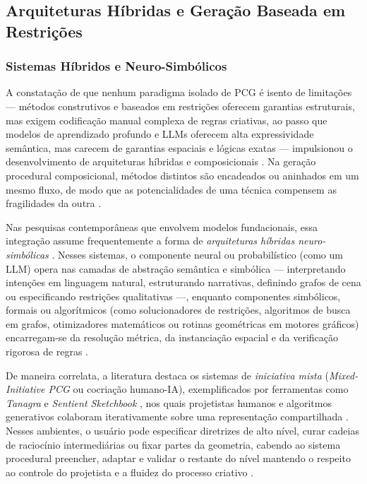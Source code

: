 \subsection{Arquiteturas Híbridas e Geração Baseada em Restrições}
\label{sec:arquiteturas_hibridas}

\subsubsection{Sistemas Híbridos e Neuro-Simbólicos}
\label{sec:sistemas_hibridos}

A constatação de que nenhum paradigma isolado de PCG é isento de limitações --- métodos construtivos e baseados em restrições oferecem garantias estruturais, mas exigem codificação manual complexa de regras criativas, ao passo que modelos de aprendizado profundo e LLMs oferecem alta expressividade semântica, mas carecem de garantias espaciais e lógicas exatas --- impulsionou o desenvolvimento de arquiteturas híbridas e composicionais \cite{linden2014dungeons, Gallotta_2024, maleki2024procedural}. Na geração procedural composicional, métodos distintos são encadeados ou aninhados em um mesmo fluxo, de modo que as potencialidades de uma técnica compensem as fragilidades da outra \cite{linden2014dungeons, maleki2024procedural}.

Nas pesquisas contemporâneas que envolvem modelos fundacionais, essa integração assume frequentemente a forma de \textit{arquiteturas híbridas neuro-simbólicas} \cite{Gallotta_2024, hu2024scenecraft, chen2025narrative, xu2025constraint}. Nesses sistemas, o componente neural ou probabilístico (como um LLM) opera nas camadas de abstração semântica e simbólica --- interpretando intenções em linguagem natural, estruturando narrativas, definindo grafos de cena ou especificando restrições qualitativas ---, enquanto componentes simbólicos, formais ou algorítmicos (como solucionadores de restrições, algoritmos de busca em grafos, otimizadores matemáticos ou rotinas geométricas em motores gráficos) encarregam-se da resolução métrica, da instanciação espacial e da verificação rigorosa de regras \cite{hu2024scenecraft, tang2025unrealllm, chen2025narrative, xu2025constraint, xu2025databasedrivenframework3dlevel, her2025zeroshot3dmapgeneration}.

De maneira correlata, a literatura destaca os sistemas de \textit{iniciativa mista} (\textit{Mixed-Initiative PCG} ou cocriação humano-IA), exemplificados por ferramentas como \textit{Tanagra} \cite{tanagra} e \textit{Sentient Sketchbook} \cite{linden2014dungeons}, nos quais projetistas humanos e algoritmos generativos colaboram iterativamente sobre uma representação compartilhada \cite{tanagra, lai2020towards, walton2020evaluating, wang2026designerlyloop}. Nesses ambientes, o usuário pode especificar diretrizes de alto nível, curar cadeias de raciocínio intermediárias ou fixar partes da geometria, cabendo ao sistema procedural preencher, adaptar e validar o restante do nível mantendo o respeito ao controle do projetista e a fluidez do processo criativo \cite{tanagra, lai2020towards, bandeali2026generative, wang2026designerlyloop}.

